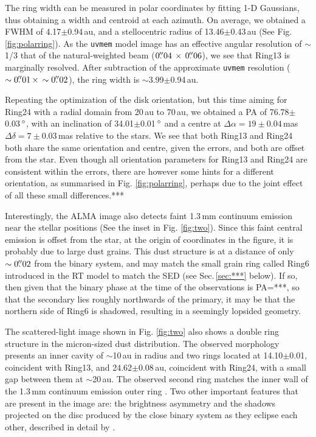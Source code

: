 \documentclass[letters,usenatbib,times]{mnras}
\begin{document}
The ring width can be measured in polar coordinates by fitting 1-D Gaussians, thus obtaining a width and centroid at each azimuth. On average, we obtained a FWHM of 4.17$\pm$0.94\,au, and a stellocentric radius of 13.46$\pm$0.43\,au (See Fig. \ref{fig:polarring}). As the {\tt uvmem} model image has an effective angular resolution of $\sim$1/3 that of the natural-weighted beam ($0\hbox{$.\!\!^{\prime\prime}$}04 \,\times \, 0\hbox{$.\!\!^{\prime\prime}$}06$), we see that Ring13 is marginally resolved. After subtraction of the approximate {\tt uvmem} resolution ($\sim0\hbox{$.\!\!^{\prime\prime}$}01 \, \times \, \sim0\hbox{$.\!\!^{\prime\prime}$}02$), the ring width is $\sim$3.99$\pm$0.94\,au. 

Repeating the optimization of the disk orientation, but this time aiming for Ring24 with a radial domain from 20\,au to 70\,au, we obtained a PA of 76.78$\pm$0.03\,$\hbox{$^\circ$}$, with an inclination of 34.01$\pm$0.01\,$\hbox{$^\circ$}$ and a centre at $\Delta \alpha = 19\pm0.04$\,mas $\Delta \delta = 7\pm0.03$\,mas relative to the stars. We see that both Ring13 and Ring24 both share the same orientation and centre, given the errors, and both are offset from the star. Even though all orientation parameters for Ring13 and Ring24 are consistent within the errors, there are however some hints for a different orientation, as summarised in Fig. \ref{fig:polarring}, perhaps due to the joint effect of all these small differences.***

Interestingly, the ALMA image also detects faint 1.3\,mm continuum emission near the stellar positions (See the inset in Fig. \ref{fig:two}). Since this faint central emission is offset from the star, at the origin of coordinates in the figure, it is probably due to large dust grains. This dust structure is at a distance of only $\sim0\hbox{$.\!\!^{\prime\prime}$}02$ from the binary system, and may match the small grain ring called Ring6 introduced in the RT model to match the SED (see Sec.\,\ref{sec:***} below). If so, then given that the binary phase at the time of the observations is PA=***, so that the secondary lies roughly northwards of the primary, it may be that the northern side of Ring6 is shadowed, resulting in a seemingly lopsided geometry.


The scattered-light image shown in Fig. \ref{fig:two} also shows a double ring structure in the micron-sized dust distribution. The observed morphology presents an inner cavity of $\sim$10\,au in radius and two rings located at 14.10$\pm$0.01, coincident with Ring13, and 24.62$\pm$0.08\,au, coincident with Ring24, with a small gap between them at $\sim$20\,au. The observed second ring matches  the inner wall of the 1.3\,mm continuum emission outer ring \citep{Ru_z_Rodr_guez_2019}. Two other important features that are present in the image are: the brightness asymmetry and the shadows projected on the disc produced by the close binary system as they eclipse each other, described in detail by \citet{dOrazi}.
\end{document}
